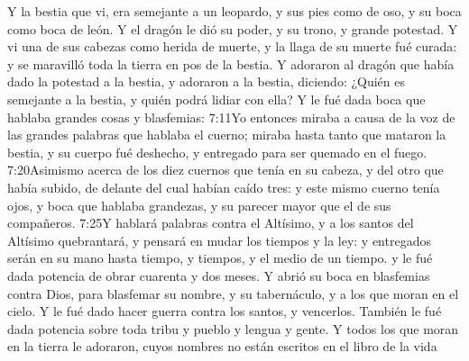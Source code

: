 Y la bestia que vi, era semejante a un leopardo, y sus pies como de oso, y su boca como boca de león. Y el dragón le dió su poder, y su trono, y grande potestad. 
Y vi una de sus cabezas como herida de muerte, y la llaga de su muerte fué curada: y se maravilló toda la tierra en pos de la bestia. 
Y adoraron al dragón que había dado la potestad a la bestia, y adoraron a la bestia, diciendo: ¿Quién es semejante a la bestia,
 y quién podrá lidiar con ella? 
Y le fué dada boca que hablaba grandes cosas y blasfemias:%
				       {7:11}{Yo entonces miraba a causa de la voz de las grandes palabras que hablaba el cuerno; miraba hasta tanto que mataron la bestia, y su cuerpo fué deshecho, y entregado para ser quemado en el fuego.}%
					   {7:20}{Asimismo acerca de los diez cuernos que tenía en su cabeza, y del otro que había subido, de delante del cual habían caído tres: y este mismo cuerno tenía ojos, y boca que hablaba grandezas, y su parecer mayor que el de sus compañeros.}
					   {7:25}{Y hablará palabras contra el Altísimo, y a los santos del Altísimo quebrantará, y pensará en mudar los tiempos y la ley: y entregados serán en su mano hasta tiempo, y tiempos, y el medio de un tiempo.}
 y le fué dada potencia de obrar cuarenta y dos meses. 
Y abrió su boca en blasfemias contra Dios, para blasfemar su nombre, y su tabernáculo, y a los que moran en el cielo.%
Y le fué dado hacer guerra contra los santos, y vencerlos. También le fué dada potencia sobre toda tribu y pueblo y lengua y gente. 
Y todos los que moran en la tierra le adoraron, cuyos nombres no están escritos en el libro de la vida%
